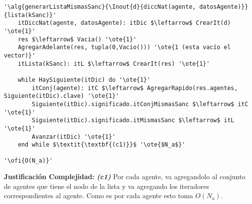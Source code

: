 \begin{lstlisting}[mathescape]
'\alg{generarListaMismasSanc}{\Inout{d}{diccNat(agente, datosAgente)}}{lista(kSanc)}'
	itDiccNat(agente, datosAgente): itDic $\leftarrow$ CrearIt(d) '\ote{1}'
	res $\leftarrow$ Vacia() '\ote{1}'
	AgregarAdelante(res, tupla(0,Vacio())) '\ote{1 (esta vacío el vector)}'
	itLista(kSanc): itL $\leftarrow$ CrearIt(res) '\ote{1}'

	while HaySiguiente(itDic) do '\ote{1}'
		itConj(agente): itC $\leftarrow$ AgregarRapido(res.agentes, Siguiente(itDic).clave) '\ote{1}'
		Siguiente(itDic).significado.itConjMismasSanc $\leftarrow$ itC '\ote{1}'
		Siguiente(itDic).significado.itMismasSanc $\leftarrow$ itL '\ote{1}'
		Avanzar(itDic) '\ote{1}'
	end while $\textit{\textbf{(c1)}}$ '\ote{$N_a$}'

'\ofi{O(N_a)}'
\end{lstlisting}

\textbf{Justificación Complejidad:} \textit{\textbf{(c1)}} Por cada agente, va agregandolo al conjunto de agentes que tiene el nodo de la lista y va agregando los iteradores correspondientes al agente. Como es por cada agente esto toma $O(N_a)$.

~


